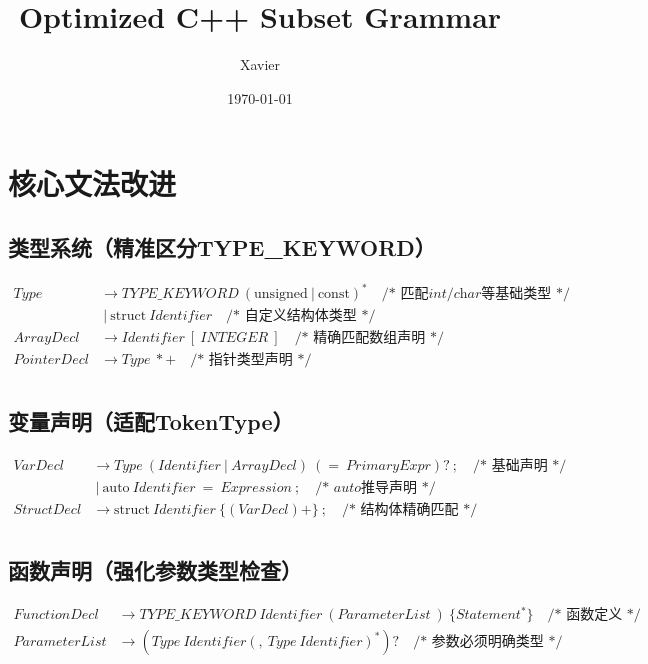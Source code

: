 \documentclass[11pt]{article}
\title{Optimized C++ Subset Grammar}
\author{Xavier}
\date{\today}
\begin{document}
\maketitle

\section*{核心文法改进}
\subsection*{类型系统（精准区分TYPE\_KEYWORD）}
\begin{align*}
Type &\rightarrow TYPE\_KEYWORD\ (\text{unsigned}\ |\ \text{const})^* \quad \textit{/* 匹配int/char等基础类型 */} \\
     &\ |\ \text{struct}\ Identifier \quad \textit{/* 自定义结构体类型 */} \\
ArrayDecl &\rightarrow Identifier\ [\ INTEGER\ ] \quad \textit{/* 精确匹配数组声明 */} \\
PointerDecl &\rightarrow Type\ *+ \quad \textit{/* 指针类型声明 */} \\
\end{align*}

\subsection*{变量声明（适配TokenType）}
\begin{align*}
VarDecl &\rightarrow Type\ (Identifier\ |\ ArrayDecl)\ (=\ PrimaryExpr)?\ ; \quad \textit{/* 基础声明 */} \\
       &\ |\ \text{auto}\ Identifier\ =\ Expression\ ; \quad \textit{/* auto推导声明 */} \\
StructDecl &\rightarrow \text{struct}\ Identifier\ \{ (VarDecl)+ \}\ ; \quad \textit{/* 结构体精确匹配 */} \\
\end{align*}

\subsection*{函数声明（强化参数类型检查）}
\begin{align*}
FunctionDecl &\rightarrow TYPE\_KEYWORD\ Identifier\ ( ParameterList\ )\ \{ Statement^* \} \quad \textit{/* 函数定义 */} \\
ParameterList &\rightarrow (Type\ Identifier(,\ Type\ Identifier)^* )? \quad \textit{/* 参数必须明确类型 */} \\
\end{align*}
\end{document}

